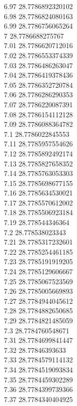 {6.97	28.7786892320102\\
6.98	28.7786824080163\\
6.99	28.7786756065264\\
7	28.7786688275767\\
7.01	28.7786620712016\\
7.02	28.7786553374339\\
7.03	28.7786486263047\\
7.04	28.7786419378436\\
7.05	28.7786352720784\\
7.06	28.7786286290353\\
7.07	28.7786220087391\\
7.08	28.7786154112128\\
7.09	28.7786088364782\\
7.1	28.7786022845553\\
7.11	28.7785957554626\\
7.12	28.7785892492174\\
7.13	28.7785827658352\\
7.14	28.7785763053303\\
7.15	28.7785698677155\\
7.16	28.7785634530021\\
7.17	28.7785570612002\\
7.18	28.7785506923184\\
7.19	28.778544346364\\
7.2	28.778538023343\\
7.21	28.7785317232601\\
7.22	28.7785254461185\\
7.23	28.7785191919205\\
7.24	28.7785129606667\\
7.25	28.7785067523569\\
7.26	28.7785005669893\\
7.27	28.7784944045612\\
7.28	28.7784882650685\\
7.29	28.7784821485059\\
7.3	28.7784760548671\\
7.31	28.7784699841447\\
7.32	28.77846393633\\
7.33	28.7784579114132\\
7.34	28.7784519093834\\
7.35	28.7784459302289\\
7.36	28.7784399739366\\
7.37	28.7784340404925\\
}
